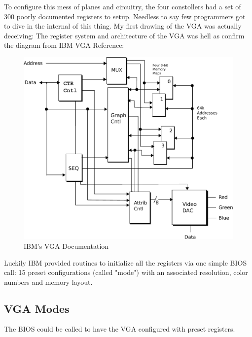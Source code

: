 \documentclass[book.tex]{subfiles}
\begin{document}
 

 

\par
To configure this mess of planes and circuitry, the four constollers had a set of 300 poorly documented registers to setup. Needless to say few programmers got to dive in the internal of this thing. My first drawing of the VGA was actually deceiving: The register system and architecture of the VGA was hell as confirm the diagram from IBM VGA Reference:\\
 \begin{figure}[H]
\centering
\includegraphics[width=\textwidth]{imgs/ibm_vga.eps}
%
\caption{IBM's VGA Documentation}
\label{fig:ibm_vga}
\end{figure}

\bigskip



Luckily IBM provided routines to initialize all the registers via one simple BIOS call: 15 preset configurations (called "mode") with an associated resolution, color numbers and memory layout.

\subsection{VGA Modes}

The BIOS could be called to have the VGA configured with preset registers.
\end{document}
